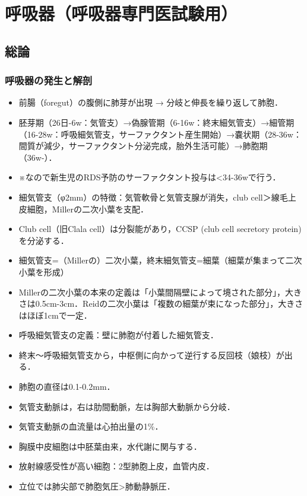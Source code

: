 

\section{呼吸器（呼吸器専門医試験用）}

\subsection{総論}

\subsubsection{呼吸器の発生と解剖}

\begin{itemize}
\item 前腸（foregut）の腹側に肺芽が出現 → 分岐と伸長を繰り返して肺胞．
\item 胚芽期（26日-6w：気管支）→偽腺管期（6-16w：終末細気管支）→細管期（16-28w：呼吸細気管支，サーファクタント産生開始）→嚢状期（28-36w：間質が減少，サーファクタント分泌完成，胎外生活可能）→肺胞期（36w-）．
\item ※なので新生児のRDS予防のサーファクタント投与は<34-36wで行う．
\item 細気管支（φ2mm）の特徴：気管軟骨と気管支腺が消失，club cell＞線毛上皮細胞，Millerの二次小葉を支配．
\item Club cell（旧Clala cell）は分裂能があり，CCSP (club cell secretory protein)を分泌する．
\item 細気管支=（Millerの）二次小葉，終末細気管支=細葉（細葉が集まって二次小葉を形成）
\item Millerの二次小葉の本来の定義は「小葉間隔壁によって境された部分」，大きさは0.5cm-3cm．Reidの二次小葉は「複数の細葉が束になった部分」，大きさはほぼ1cmで一定．
\item 呼吸細気管支の定義：壁に肺胞が付着した細気管支．
\item 終末〜呼吸細気管支から，中枢側に向かって逆行する反回枝（娘枝）が出る．
\item 肺胞の直径は0.1-0.2mm．
\item 気管支動脈は，右は肋間動脈，左は胸部大動脈から分岐．
\item 気管支動脈の血流量は心拍出量の1\%．
\item 胸膜中皮細胞は中胚葉由来，水代謝に関与する．
\item 放射線感受性が高い細胞：2型肺胞上皮，血管内皮．
\item 立位では肺尖部で肺胞気圧>肺動静脈圧．
\end{itemize}



